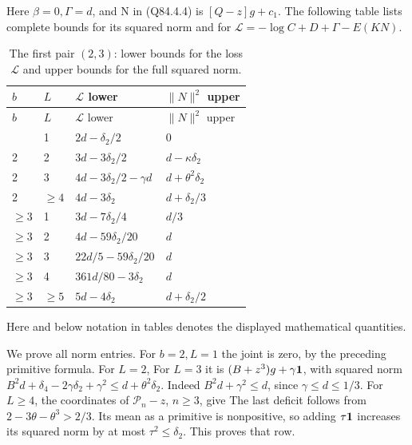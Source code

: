 Here \(\beta=0,\allowbreak  \Gamma=d\), and N in (Q84.4.4) is
\([Q-z]g+c_{1}\). The following table lists complete bounds for its squared
norm and for \(\mathcal L=-\log C+D+\Gamma-E(KN)\).


\begingroup\small
\setlength{\tabcolsep}{3pt}
\setlength{\LTleft}{0pt}\setlength{\LTright}{\fill}
\begin{longtable}{@{}llp{.38\linewidth}p{.38\linewidth}@{}}
\caption{The first pair \((2,3)\): lower bounds for the loss \(\mathcal L\) and upper bounds for the full squared norm.}
\label{tab:odd84:root23}\\
\toprule
\(b\)&\(L\)&\(\mathcal L\) lower&\(\|N\|^2\) upper\\
\midrule\endfirsthead
\toprule
\(b\)&\(L\)&\(\mathcal L\) lower&\(\|N\|^2\) upper\\
\midrule\endhead
\bottomrule\endfoot
2&1&\(2d-\delta_2/2\)&0\\
2&2&\(3d-3\delta_2/2\)&\(d-\kappa\delta_2\)\\
2&3&\(4d-3\delta_2/2-\gamma d\)&\(d+\theta^2\delta_2\)\\
2&\(\ge4\)&\(4d-3\delta_2\)&\(d+\delta_2/3\)\\
\(\ge3\)&1&\(3d-7\delta_2/4\)&\(d/3\)\\
\(\ge3\)&2&\(4d-59\delta_2/20\)&\(d\)\\
\(\ge3\)&3&\(22d/5-59\delta_2/20\)&\(d\)\\
\(\ge3\)&4&\(361d/80-3\delta_2\)&\(d\)\\
\(\ge3\)&\(\ge5\)&\(5d-4\delta_2\)&\(d+\delta_2/2\)\\
\end{longtable}
\endgroup


Here and below notation in tables denotes the displayed mathematical
quantities.

We prove all norm entries. For \(b=2,\allowbreak  L=1\) the joint is zero,
by the preceding primitive formula. For \(L=2\),
For \(L=3\) it is \((B+z^3)g+\gamma\mathbf1\), with squared norm
\(B^2d+\delta_4-2\gamma \delta_2+\gamma^2\le d+\theta^2\delta_2\).
Indeed \(B^2d+\gamma^2\le d\), since \(\gamma\le d\le 1/3\).
For \(L\ge 4\), the coordinates of \(\mathcal P_n-z\), \(n\ge 3\), give
The last deficit follows from \(2-3\theta-\theta^3>2/3\).
Its mean as a primitive is nonpositive, so adding \(\tau\mathbf1\) increases
its squared norm by at most \(\tau^2\le \delta_2\). This proves that row.

